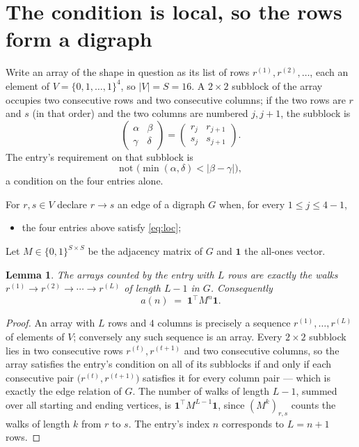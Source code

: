 \documentclass[11pt,a4paper]{article}
\theoremstyle{plain}
\newtheorem{lemma}[theorem]{Lemma}
\theoremstyle{definition}
\begin{document}
\section{The condition is local, so the rows form a digraph}

Write an array of the shape in question as its list of rows
$r^{(1)},r^{(2)},\dots$, each an element of
$V=\{0,1,\dots,1\}^{4}$, so $|V|=S=16$. A $2\times2$ subblock of the array
occupies two consecutive rows and two consecutive columns; if the two rows are $r$
and $s$ (in that order) and the two columns are numbered $j,j+1$,
the subblock is
\[
\begin{pmatrix}\alpha&\beta\\\gamma&\delta\end{pmatrix}=\begin{pmatrix}r_j&r_{j+1}\\s_j&s_{j+1}\end{pmatrix}.
\]
The entry's requirement on that subblock is
\begin{equation}\label{eq:loc}
\text{not }\bigl(\min(\alpha,\delta)<|\beta-\gamma|\bigr),
\end{equation}
a condition on the four entries alone.

For $r,s\in V$ declare $r\to s$ an edge of a digraph $G$ when, for every
$1\le j\le 4-1$,
\begin{itemize}
\item the four entries above satisfy \eqref{eq:loc};

\end{itemize}
Let $M\in\{0,1\}^{S\times S}$ be the adjacency matrix of $G$ and $\mathbf{1}$ the
all-ones vector.

\begin{lemma}\label{lem:walk}
The arrays counted by the entry with $L$ rows are exactly the walks
$r^{(1)}\to r^{(2)}\to\cdots\to r^{(L)}$ of length $L-1$ in $G$. Consequently
\[
a(n)\;=\;\mathbf{1}^{\!\top}M^{n}\mathbf{1} .
\]
\end{lemma}

\begin{proof}
An array with $L$ rows and $4$ columns is precisely a sequence
$r^{(1)},\dots,r^{(L)}$ of elements of $V$; conversely any such sequence is an array.
Every $2\times2$ subblock lies in two consecutive rows $r^{(t)},r^{(t+1)}$ and two
consecutive columns, so the array satisfies the entry's condition on all of its subblocks
if and only if each consecutive pair $\bigl(r^{(t)},r^{(t+1)}\bigr)$ satisfies it for
every column pair --- which is exactly the edge relation of $G$. The number of walks of
length $L-1$, summed over all starting and ending vertices, is
$\mathbf{1}^{\!\top}M^{L-1}\mathbf{1}$, since $(M^{k})_{r,s}$ counts the walks of
length $k$ from $r$ to $s$. The entry's index $n$ corresponds to $L=n+1$ rows.
\end{proof}
\end{document}

